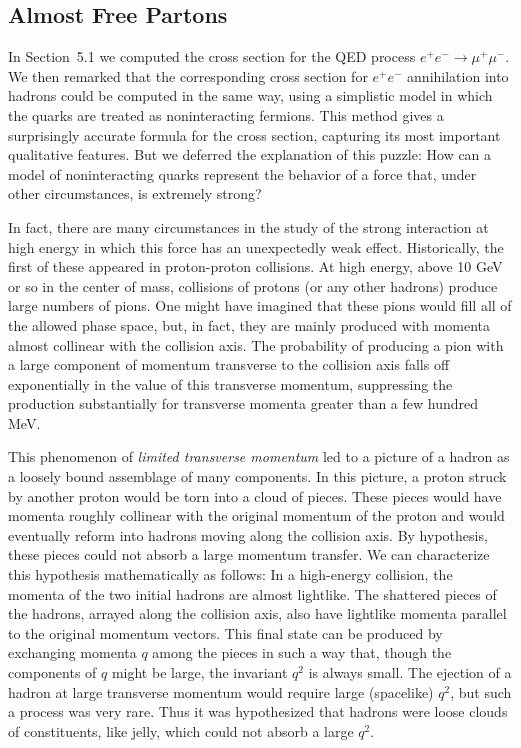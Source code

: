 \subsection*{Almost Free Partons}

In Section~5.1 we computed the cross section for the QED process
$e^{+}e^{-}\to\mu^{+}\mu^{-}$.  We then remarked that the corresponding cross
section for $e^{+}e^{-}$ annihilation into hadrons could be computed in the
same way, using a simplistic model in which the quarks are treated as
noninteracting fermions.  This method gives a surprisingly accurate formula
for the cross section, capturing its most important qualitative features.
But we deferred the explanation of this puzzle: How can a model of
noninteracting quarks represent the behavior of a force that, under other
circumstances, is extremely strong?

In fact, there are many circumstances in the study of the strong interaction
at high energy in which this force has an unexpectedly weak effect.
Historically, the first of these appeared in proton-proton collisions.  At
high energy, above 10 GeV or so in the center of mass, collisions of protons
(or any other hadrons) produce large numbers of pions.  One might have
imagined that these pions would fill all of the allowed phase space, but, in
fact, they are mainly produced with momenta almost collinear with the
collision axis.  The probability of producing a pion with a large component
of momentum transverse to the collision axis falls off exponentially in the
value of this transverse momentum, suppressing the production substantially
for transverse momenta greater than a few hundred MeV.

This phenomenon of \emph{limited transverse momentum} led to a picture of a
hadron as a loosely bound assemblage of many components.  In this picture, a
proton struck by another proton would be torn into a cloud of pieces.  These
pieces would have momenta roughly collinear with the original momentum of
the proton and would eventually reform into hadrons moving along the
collision axis.  By hypothesis, these pieces could not absorb a large
momentum transfer.  We can characterize this hypothesis mathematically as
follows: In a high-energy collision, the momenta of the two initial hadrons
are almost lightlike.  The shattered pieces of the hadrons, arrayed along the
collision axis, also have lightlike momenta parallel to the original momentum
vectors.  This final state can be produced by exchanging momenta $q$ among
the pieces in such a way that, though the components of $q$ might be large,
the invariant $q^2$ is always small.  The ejection of a hadron at large
transverse momentum would require large (spacelike) $q^2$, but such a process
was very rare.  Thus it was hypothesized that hadrons were loose clouds of
constituents, like jelly, which could not absorb a large $q^2$.

